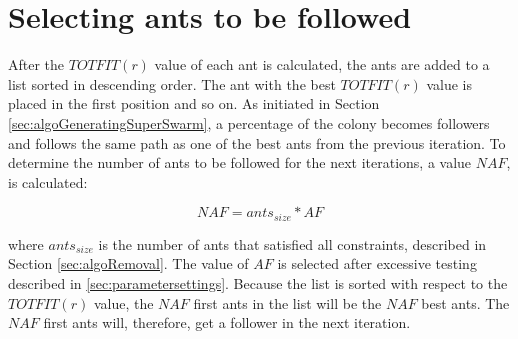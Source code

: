 \section{Selecting ants to be followed}
\label{sec:selctingAntsToBeFollowed}

After the $TOTFIT(r)$ value of each ant is calculated, the ants are added to a list sorted in descending order. The ant with the best $TOTFIT(r)$ value is placed in the first position and so on. As initiated in Section \vref{sec:algoGeneratingSuperSwarm}, a percentage of the colony becomes followers and follows the same path as one of the best ants from the previous iteration. To determine the number of ants to be followed for the next iterations, a value $NAF$, is calculated:

$$NAF = ants_{size} * AF$$
 
where $ants_{size}$ is the number of ants that satisfied all constraints, described in Section \vref{sec:algoRemoval}. The value of $AF$ is selected after excessive testing described in \vref{sec:parametersettings}. Because the list is sorted with respect to the $TOTFIT(r)$ value, the $NAF$ first ants in the list will be the $NAF$ best ants. The $NAF$ first ants will, therefore, get a follower in the next iteration.


 